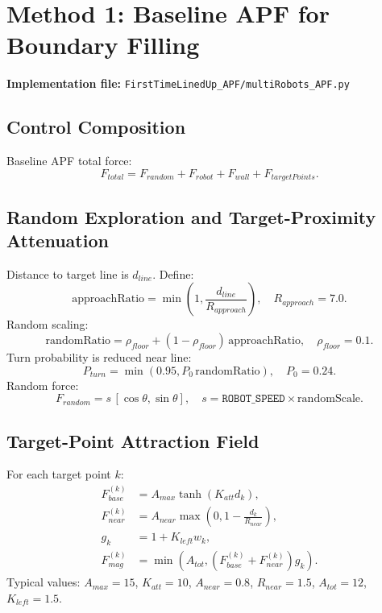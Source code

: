 \documentclass[11pt,a4paper]{article}
\begin{document}
\section{Method 1: Baseline APF for Boundary Filling}
\textbf{Implementation file:} \texttt{FirstTimeLinedUp\_APF/multiRobots\_APF.py}

\subsection{Control Composition}
Baseline APF total force:
\begin{equation}
    F_{total}=F_{random}+F_{robot}+F_{wall}+F_{targetPoints}.
\end{equation}

\subsection{Random Exploration and Target-Proximity Attenuation}
Distance to target line is $d_{line}$. Define:
\begin{equation}
    \mathrm{approachRatio}=\min\left(1,\frac{d_{line}}{R_{approach}}\right),\quad R_{approach}=7.0.
\end{equation}
Random scaling:
\begin{equation}
    \mathrm{randomRatio}=\rho_{floor}+(1-\rho_{floor})\,\mathrm{approachRatio},\quad \rho_{floor}=0.1.
\end{equation}
Turn probability is reduced near line:
\begin{equation}
    P_{turn}=\min\left(0.95, P_0\,\mathrm{randomRatio}\right),\quad P_0=0.24.
\end{equation}
Random force:
\begin{equation}
    F_{random}=s\,[\cos\theta,\sin\theta],\quad s=\texttt{ROBOT\_SPEED}\times\mathrm{randomScale}.
\end{equation}

\subsection{Target-Point Attraction Field}
For each target point $k$:
\begin{align}
    F^{(k)}_{base} &= A_{max}\tanh(K_{att}d_k), \\
    F^{(k)}_{near} &= A_{near}\max\left(0,1-\frac{d_k}{R_{near}}\right), \\
    g_k &= 1 + K_{left}w_k, \\
    F^{(k)}_{mag} &= \min\left(A_{tot},(F^{(k)}_{base}+F^{(k)}_{near})g_k\right).
\end{align}
Typical values: $A_{max}=15$, $K_{att}=10$, $A_{near}=0.8$, $R_{near}=1.5$, $A_{tot}=12$, $K_{left}=1.5$.
\end{document}
